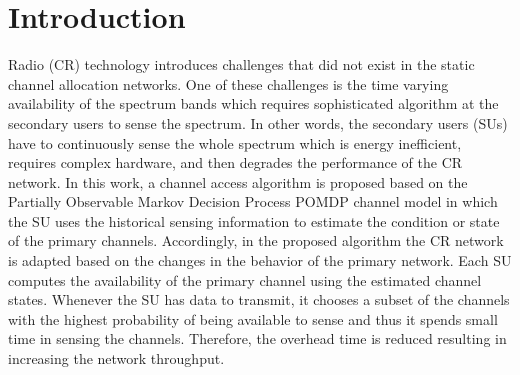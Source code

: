 \documentclass[twocolumn]{el-author}
\begin{document}
	\section{Introduction}
	Radio (CR) technology introduces challenges that did not exist in the static channel allocation networks. One of these challenges is the time varying availability of the spectrum bands which requires sophisticated algorithm at the secondary users to sense the spectrum\cite{AhmedGaniAbolfazliEtAl2016,Lunden2015}. In other words, the secondary users (SUs) have to continuously sense the whole spectrum which is energy inefficient, requires complex hardware, and then degrades the performance of the CR network.
	In this work, a channel access algorithm is proposed based on the Partially Observable Markov Decision Process POMDP channel model in which the SU uses the historical sensing information to estimate the condition or state of the primary channels. Accordingly, in the proposed algorithm the CR network is adapted based on the changes in the behavior of the primary network. Each SU computes the availability of the primary channel using the estimated channel states. Whenever the SU has data to transmit, it chooses a subset of the channels with the highest probability of being available to sense and thus it spends small time in sensing the channels. Therefore, the overhead time is reduced resulting in increasing the network throughput.
%	
\end{document}
